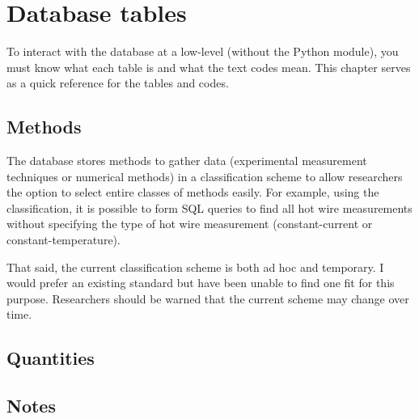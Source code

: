 %
\chapter{Database tables}

To interact with the database at a low-level (without the Python module), you
must know what each table is and what the text codes mean.  This chapter serves
as a quick reference for the tables and codes.


\section{Methods}

The database stores methods to gather data (experimental measurement techniques
or numerical methods) in a classification scheme to allow researchers the
option to select entire classes of methods easily.  For example, using the
classification, it is possible to form SQL queries to find all hot wire
measurements without specifying the type of hot wire measurement
(constant-current or constant-temperature).

That said, the current classification scheme is both ad hoc and temporary.  I
would prefer an existing standard but have been unable to find one fit for this
purpose.  Researchers should be warned that the current scheme may change over
time.




\section{Quantities}




\section{Notes}


